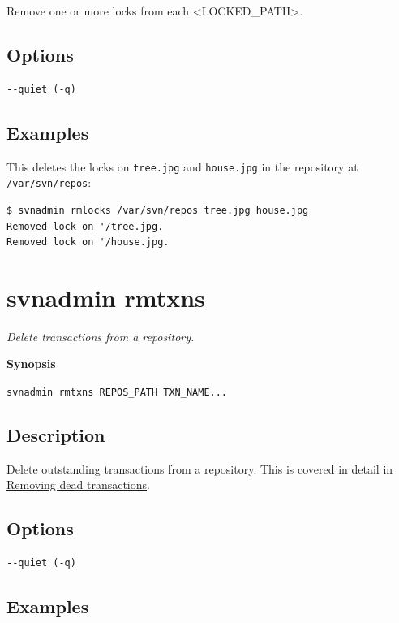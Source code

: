 Remove one or more locks from each \textless LOCKED\_PATH\textgreater.

\subsection{Options}

\begin{verbatim}
--quiet (-q)
\end{verbatim}

\subsection{Examples}

This deletes the locks on \texttt{tree.jpg} and \texttt{house.jpg} in
the repository at \texttt{/var/svn/repos}:

\begin{verbatim}
$ svnadmin rmlocks /var/svn/repos tree.jpg house.jpg
Removed lock on '/tree.jpg.
Removed lock on '/house.jpg.
\end{verbatim}

\section{svnadmin rmtxns}\label{svn.ref.svnadmin.c.rmtxns}

\emph{Delete transactions from a repository.}

\textbf{Synopsis}

\texttt{svnadmin\ rmtxns\ REPOS\_PATH\ TXN\_NAME...}

\subsection{Description}

Delete outstanding transactions from a repository. This is covered in
detail in \hyperref[svn.reposadmin.maint.diskspace.deadtxns]{Removing
dead transactions}.

\subsection{Options}

\begin{verbatim}
--quiet (-q)
\end{verbatim}

\subsection{Examples}

